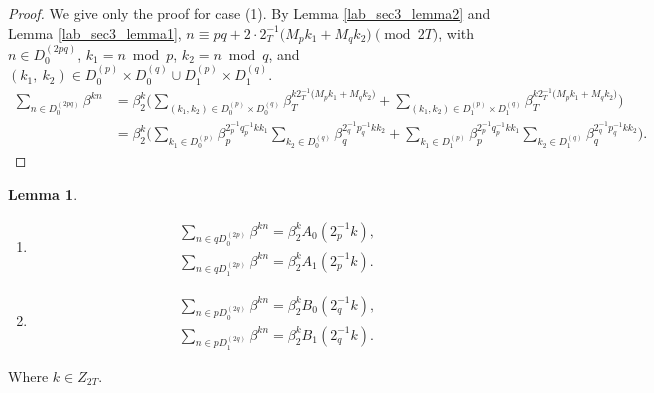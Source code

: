 \documentclass{mcom-l}
\theoremstyle{definition}
\newtheorem{sec3lemma6}[sec3lemma1]{Lemma}
\numberwithin{equation}{section}
\begin{document}
              \begin{proof}
              We give only the proof for case (1). By Lemma \ref{lab_sec3_lemma2} and Lemma \ref{lab_sec3_lemma1}, $ n\equiv pq+2\cdot 2_{T}^{-1}\bigl(M_{p}k_{1}+M_{q}k_{2}\bigr) \pmod{2T}$, with $ n\in D_{0}^{(2pq)} $, $ k_{1}=n\bmod p $, $ k_{2}=n\bmod q $, and $(k_{1},\ k_{2})\in D_{0}^{(p)}\times D_{0}^{(q)}\cup D_{1}^{(p)}\times D_{1}^{(q)} $.
              \begin{equation*}
              \begin{split}
              \sum_{n\in D_{0}^{(2pq)}}\beta^{kn}&=\beta_{2}^{k}\bigl(\sum_{(k_{1},k_{2})\in D_{0}^{(p)}\times D_{0}^{(q)}}\beta_{T}^{k2_{T}^{-1}\bigl(M_{p}k_{1}+M_{q}k_{2}\bigr)}+
              \sum_{(k_{1},k_{2})\in D_{1}^{(p)}\times D_{1}^{(q)}}\beta_{T}^{k2_{T}^{-1}\bigl(M_{p}k_{1}+M_{q}k_{2}\bigr)}
              \bigr)\\
              &=\beta_{2}^{k}\bigl(
              \sum_{k_{1}\in D_{0}^{(p)}}\beta_{p}^{2^{-1}_{p}q^{-1}_{p}kk_{1}}\sum_{k_{2}\in D_{0}^{(q)}}\beta_{q}^{2^{-1}_{q}p^{-1}_{q}kk_{2}}+
              \sum_{k_{1}\in D_{1}^{(p)}}\beta_{p}^{2^{-1}_{p}q^{-1}_{p}kk_{1}}\sum_{k_{2}\in D_{1}^{(q)}}\beta_{q}^{2^{-1}_{q}p^{-1}_{q}kk_{2}}
              \bigr).
              \end{split}
              \end{equation*}
              \end{proof}
            \begin{sec3lemma6}\label{lab_sec3_lemma6}
            \begin{enumerate} \item
            \begin{equation*}
            \begin{split}
              &\sum_{n\in qD_{0}^{(2p)}}\beta^{kn}=\beta_{2}^{k}A_{0}(2^{-1}_{p}k),\\
              &\sum_{n\in qD_{1}^{(2p)}}\beta^{kn}=\beta_{2}^{k}A_{1}(2^{-1}_{p}k).
             \end{split}
            \end{equation*}
            \item
            \begin{equation*}
             \begin{split}
            &\sum_{n\in pD_{0}^{(2q)}}\beta^{kn}=\beta_{2}^{k}B_{0}(2^{-1}_{q}k),\\
            &\sum_{n\in pD_{1}^{(2q)}}\beta^{kn}=\beta_{2}^{k}B_{1}(2^{-1}_{q}k).
            \end{split}
            \end{equation*}
            \end{enumerate}
            Where $ k\in Z_{2T} $.
            \end{sec3lemma6}
\end{document}
